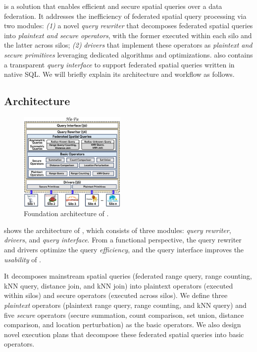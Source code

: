 \sysname is a solution that enables efficient and secure spatial queries over a data federation.
It addresses the inefficiency of federated spatial query processing via two modules:
\textit{(1)} a novel \textit{query rewriter} that decomposes federated spatial queries into \textit{plaintext and secure operators}, with the former executed within each silo and the latter across silos;
\textit{(2)} \textit{drivers} that implement these operators as \textit{plaintext and secure primitives} leveraging dedicated algorithms and optimizations.
\sysname also contains a transparent \textit{query interface} to support federated spatial queries written in native SQL.
We will briefly explain its architecture and workflow as follows.

\subsection{Architecture}
\label{sec:architecture}

\begin{figure}[t]
    \centering
    \includegraphics[width=0.46\textwidth]{hufu-new-architecture.pdf}
    \caption{Foundation architecture of \sysname.}
	\label{fig:arch}
\end{figure}

 shows the architecture of \sysname, which consists of three modules: \textit{query rewriter}, \textit{drivers}, and \textit{query interface}.
From a functional perspective, the query rewriter and drivers optimize the query \textit{efficiency}, and the query interface improves the \textit{usability} of \sysname.

It decomposes mainstream spatial queries (federated range query, range counting, kNN query, distance join, and kNN join) into plaintext operators (executed within silos) and secure operators (executed across silos).
We define three \textit{plaintext} operators (plaintext range query, range counting, and kNN query) and five \textit{secure} operators (secure summation, count comparison, set union, distance comparison, and location perturbation) as the basic operators. 
We also design novel execution plans that decompose these federated spatial queries into basic operators.


